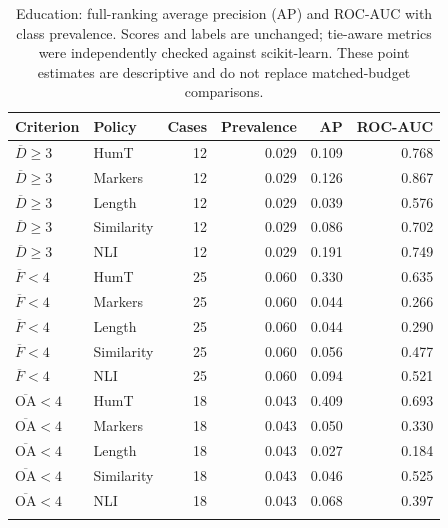 \begin{table}[p]
\centering\footnotesize
\caption{Education: full-ranking average precision (AP) and ROC-AUC with class prevalence. Scores and labels are unchanged; tie-aware metrics were independently checked against scikit-learn. These point estimates are descriptive and do not replace matched-budget comparisons.}
\label{tab:ranking_education}
\begin{tabular}{llrrrr}
\toprule
Criterion & Policy & Cases & Prevalence & AP & ROC-AUC \\
\midrule
$\overline D\geq3$ & HumT & 12 & 0.029 & 0.109 & 0.768 \\
$\overline D\geq3$ & Markers & 12 & 0.029 & 0.126 & 0.867 \\
$\overline D\geq3$ & Length & 12 & 0.029 & 0.039 & 0.576 \\
$\overline D\geq3$ & Similarity & 12 & 0.029 & 0.086 & 0.702 \\
$\overline D\geq3$ & NLI & 12 & 0.029 & 0.191 & 0.749 \\
\addlinespace
$\overline F<4$ & HumT & 25 & 0.060 & 0.330 & 0.635 \\
$\overline F<4$ & Markers & 25 & 0.060 & 0.044 & 0.266 \\
$\overline F<4$ & Length & 25 & 0.060 & 0.044 & 0.290 \\
$\overline F<4$ & Similarity & 25 & 0.060 & 0.056 & 0.477 \\
$\overline F<4$ & NLI & 25 & 0.060 & 0.094 & 0.521 \\
\addlinespace
$\overline{\mathrm{OA}}<4$ & HumT & 18 & 0.043 & 0.409 & 0.693 \\
$\overline{\mathrm{OA}}<4$ & Markers & 18 & 0.043 & 0.050 & 0.330 \\
$\overline{\mathrm{OA}}<4$ & Length & 18 & 0.043 & 0.027 & 0.184 \\
$\overline{\mathrm{OA}}<4$ & Similarity & 18 & 0.043 & 0.046 & 0.525 \\
$\overline{\mathrm{OA}}<4$ & NLI & 18 & 0.043 & 0.068 & 0.397 \\
\addlinespace
\bottomrule
\end{tabular}
\end{table}

